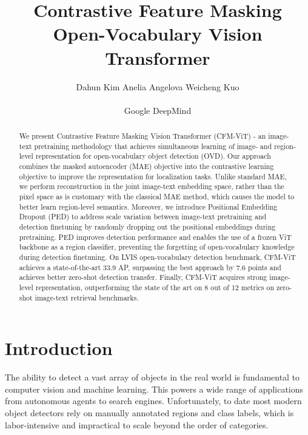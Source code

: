 \documentclass[10pt,twocolumn,letterpaper]{article}
\newcommand{\ours}{CFM-ViT\xspace}
\begin{document}
\title{Contrastive Feature Masking Open-Vocabulary Vision Transformer}

\author{
Dahun Kim  \quad\quad\quad Anelia Angelova \quad\quad\quad Weicheng Kuo\\\\
Google DeepMind\\
}

\maketitle
\ificcvfinal\thispagestyle{empty}\fi


\begin{abstract}
We present Contrastive Feature Masking Vision Transformer (\ours) - an image-text pretraining methodology that achieves simultaneous learning of image- and region-level representation for open-vocabulary object detection (OVD). Our approach combines the masked autoencoder (MAE) objective into the contrastive learning objective to improve the representation for localization tasks.  Unlike standard MAE, we perform reconstruction in the joint image-text embedding space, rather than the pixel space as is customary with the classical MAE method, which causes the model to better learn region-level semantics. Moreover, we introduce Positional Embedding Dropout (PED) to address scale variation between image-text pretraining and detection finetuning by randomly dropping out the positional embeddings during pretraining. PED improves detection performance and enables the use of a frozen ViT backbone as a region classifier, preventing the forgetting of open-vocabulary knowledge during detection finetuning. On LVIS open-vocabulary detection benchmark, \ours achieves a state-of-the-art 33.9 AP, surpassing the best approach by 7.6 points and achieves better zero-shot detection transfer.
Finally, \ours acquires strong image-level representation, outperforming the state of the art on 8 out of 12 metrics on zero-shot image-text retrieval benchmarks. 

\end{abstract}
\vspace{-4mm}


\section{Introduction}


The ability to detect a vast array of objects in the real world is fundamental to computer vision and machine learning. This powers a wide range of applications from autonomous agents to search engines. Unfortunately, to date most modern object detectors rely on manually annotated regions and class labels, which is labor-intensive and impractical to scale beyond the order of  categories.
\end{document}
